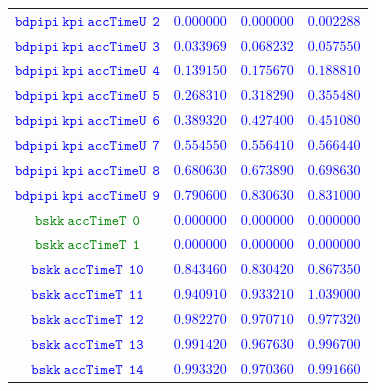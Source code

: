 \documentclass[10pt,a4paper]{article}
\begin{document}
\begin{table}[h!]
{\begin{tabular}{cccc}
\textcolor{blue}{$\mathtt{bdpipi~kpi~accTimeU~~2}$} & \textcolor{blue}{$0.000000$}& \textcolor{blue}{$0.000000$}& \textcolor{blue}{$0.002288$}\\
\textcolor{blue}{$\mathtt{bdpipi~kpi~accTimeU~~3}$} & \textcolor{blue}{$0.033969$}& \textcolor{blue}{$0.068232$}& \textcolor{blue}{$0.057550$}\\
\textcolor{blue}{$\mathtt{bdpipi~kpi~accTimeU~~4}$} & \textcolor{blue}{$0.139150$}& \textcolor{blue}{$0.175670$}& \textcolor{blue}{$0.188810$}\\
\textcolor{blue}{$\mathtt{bdpipi~kpi~accTimeU~~5}$} & \textcolor{blue}{$0.268310$}& \textcolor{blue}{$0.318290$}& \textcolor{blue}{$0.355480$}\\
\textcolor{blue}{$\mathtt{bdpipi~kpi~accTimeU~~6}$} & \textcolor{blue}{$0.389320$}& \textcolor{blue}{$0.427400$}& \textcolor{blue}{$0.451080$}\\
\textcolor{blue}{$\mathtt{bdpipi~kpi~accTimeU~~7}$} & \textcolor{blue}{$0.554550$}& \textcolor{blue}{$0.556410$}& \textcolor{blue}{$0.566440$}\\
\textcolor{blue}{$\mathtt{bdpipi~kpi~accTimeU~~8}$} & \textcolor{blue}{$0.680630$}& \textcolor{blue}{$0.673890$}& \textcolor{blue}{$0.698630$}\\
\textcolor{blue}{$\mathtt{bdpipi~kpi~accTimeU~~9}$} & \textcolor{blue}{$0.790600$}& \textcolor{blue}{$0.830630$}& \textcolor{blue}{$0.831000$}\\
\textcolor{Green}{$\mathtt{bskk~accTimeT~~0}$} & \textcolor{blue}{$0.000000$}& \textcolor{blue}{$0.000000$}& \textcolor{blue}{$0.000000$}\\
\textcolor{Green}{$\mathtt{bskk~accTimeT~~1}$} & \textcolor{blue}{$0.000000$}& \textcolor{blue}{$0.000000$}& \textcolor{blue}{$0.000000$}\\
\textcolor{blue}{$\mathtt{bskk~accTimeT~~10}$} & \textcolor{blue}{$0.843460$}& \textcolor{blue}{$0.830420$}& \textcolor{blue}{$0.867350$}\\
\textcolor{blue}{$\mathtt{bskk~accTimeT~~11}$} & \textcolor{blue}{$0.940910$}& \textcolor{blue}{$0.933210$}& \textcolor{blue}{$1.039000$}\\
\textcolor{blue}{$\mathtt{bskk~accTimeT~~12}$} & \textcolor{blue}{$0.982270$}& \textcolor{blue}{$0.970710$}& \textcolor{blue}{$0.977320$}\\
\textcolor{blue}{$\mathtt{bskk~accTimeT~~13}$} & \textcolor{blue}{$0.991420$}& \textcolor{blue}{$0.967630$}& \textcolor{blue}{$0.996700$}\\
\textcolor{blue}{$\mathtt{bskk~accTimeT~~14}$} & \textcolor{blue}{$0.993320$}& \textcolor{blue}{$0.970360$}& \textcolor{blue}{$0.991660$}\\

\end{tabular}}
\end{table}
\end{document}

